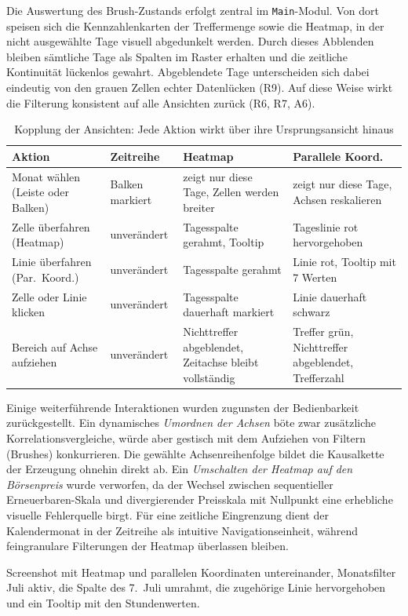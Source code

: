 Die Auswertung des Brush-Zustands erfolgt zentral im \texttt{Main}-Modul. Von dort speisen sich die
Kennzahlenkarten der Treffermenge sowie die Heatmap, in der nicht ausgewählte Tage visuell abgedunkelt
werden. Durch dieses Abblenden bleiben sämtliche Tage als Spalten im Raster erhalten und die zeitliche
Kontinuität lückenlos gewahrt. Abgeblendete Tage unterscheiden sich dabei eindeutig von den grauen Zellen
echter Datenlücken (R9). Auf diese Weise wirkt die Filterung konsistent auf alle Ansichten zurück (R6, R7, A6).

\begin{table}[H]
\centering\small
\caption{Kopplung der Ansichten: Jede Aktion wirkt über ihre Ursprungsansicht hinaus}\label{tab:kopplung}
\begin{tabular}{@{}p{3.9cm}p{2.9cm}p{3.6cm}p{3.6cm}@{}}
\toprule
Aktion & Zeitreihe & Heatmap & Parallele Koord. \\
\midrule
Monat wählen (Leiste oder Balken)
  & Balken markiert
  & zeigt nur diese Tage, Zellen werden breiter
  & zeigt nur diese Tage, Achsen reskalieren \\[0.3em]
Zelle überfahren (Heatmap)
  & unverändert
  & Tagesspalte gerahmt, Tooltip
  & Tageslinie rot hervorgehoben \\[0.3em]
Linie überfahren (Par.\ Koord.)
  & unverändert
  & Tagesspalte gerahmt
  & Linie rot, Tooltip mit 7 Werten \\[0.3em]
Zelle oder Linie klicken
  & unverändert
  & Tagesspalte dauerhaft markiert
  & Linie dauerhaft schwarz \\[0.3em]
Bereich auf Achse aufziehen
  & unverändert
  & Nichttreffer abgeblendet, Zeitachse bleibt vollständig
  & Treffer grün, Nichttreffer abgeblendet, Trefferzahl \\
\bottomrule
\end{tabular}
\end{table}

Einige weiterführende Interaktionen wurden zugunsten der Bedienbarkeit zurückgestellt. Ein dynamisches \emph{Umordnen der Achsen} \cite{Heinrich2013} böte zwar zusätzliche Korrelationsvergleiche, würde aber gestisch mit dem Aufziehen von Filtern (Brushes) konkurrieren. Die gewählte Achsenreihenfolge bildet die Kausalkette der Erzeugung ohnehin direkt ab. Ein \emph{Umschalten der Heatmap auf den Börsenpreis} wurde verworfen, da der Wechsel zwischen sequentieller Erneuerbaren-Skala und divergierender Preisskala mit Nullpunkt eine erhebliche visuelle Fehlerquelle birgt. Für eine zeitliche Eingrenzung dient der Kalendermonat in der Zeitreihe als intuitive Navigationseinheit, während feingranulare Filterungen der Heatmap überlassen bleiben.

{Screenshot mit Heatmap und parallelen Koordinaten untereinander, Monatsfilter Juli aktiv, die
Spalte des 7.\ Juli umrahmt, die zugehörige Linie hervorgehoben und ein Tooltip mit den
Stundenwerten.}
